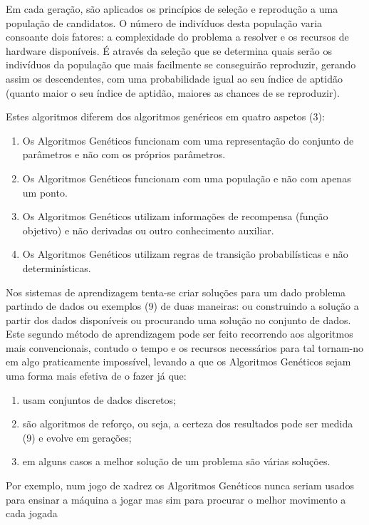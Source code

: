 Em cada geração, são aplicados os princípios de seleção e reprodução a uma população de candidatos. O número de indivíduos desta população varia consoante dois fatores: a complexidade do problema a resolver e os recursos de hardware disponíveis. É através da seleção que se determina quais serão os indivíduos da população que mais facilmente se conseguirão reproduzir, gerando assim os descendentes, com uma probabilidade igual ao seu índice de aptidão (quanto maior o seu índice de aptidão, maiores as chances de se reproduzir). 

Estes algoritmos diferem dos algoritmos genéricos em quatro aspetos (3):
\begin{enumerate}
\item Os Algoritmos Genéticos funcionam com uma representação do conjunto de parâmetros e não com os próprios parâmetros.
\item Os Algoritmos Genéticos funcionam com uma população e não com apenas um ponto.
\item Os Algoritmos Genéticos utilizam informações de recompensa (função objetivo) e não derivadas ou outro conhecimento auxiliar.
\item Os Algoritmos Genéticos utilizam regras de transição probabilísticas e não determinísticas.
\end{enumerate}

Nos sistemas de aprendizagem tenta-se criar soluções para um dado problema partindo de dados ou exemplos (9) de duas maneiras: ou construindo a solução a partir dos dados disponíveis ou procurando uma solução no conjunto de dados. Este segundo método de aprendizagem pode ser feito recorrendo aos algoritmos mais convencionais, contudo o tempo e os recursos necessários para tal tornam-no em algo praticamente impossível, levando a que os Algoritmos Genéticos sejam uma forma mais efetiva de o fazer já que: 
\begin{enumerate}
\item usam conjuntos de dados discretos;
\item são algoritmos de reforço, ou seja, a certeza dos resultados pode ser medida (9) e evolve em gerações;
\item em alguns casos a melhor solução de um problema são várias soluções. 
\end{enumerate}

Por exemplo, num jogo de xadrez os Algoritmos Genéticos nunca seriam usados para ensinar a máquina a jogar mas sim para procurar o melhor movimento a cada jogada

